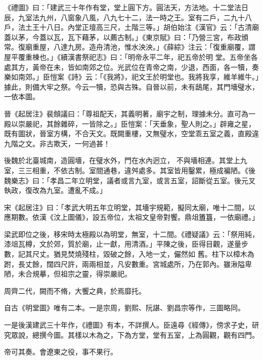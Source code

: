 \begin{pinyinscope}
 《禮圖》曰：「建武三十年作有堂，堂上圓下方。圓法天，方法地。十二堂法日辰，九室法九州，八窗象八風，八九七十二，法一時之王。室有二戶，二九十八戶，法土王十八日。內堂正壇高三尺，土階三等。」胡伯始注《漢官》云：「古清廟蓋以茅，今蓋以瓦，瓦下藉茅，以薦古制。」《東京賦》曰：「乃營三宮，布政頒常。復廟重屋，八達九房。造舟清池，惟水泱泱。」《薛綜》注云：「復重廟覆，謂屋平覆重棟也。」《續漢書祭祀志》曰：「明帝永平二年，祀五帝於明
 堂。五帝坐各處其方，黃帝在未，皆如南郊之位。光武位在青帝之南，少退，西面，各一犢，奏樂如南郊。」臣愷案《詩》云：「《我將》，祀文王於明堂也。我將我享，維羊維牛。」據此，則備大牢之祭。今云一犢，恐與古殊。自晉以前，未有鴟尾，其門墻璧水，一依本圖。



 晉《起居注》裴頠議曰：「尊祖配天，其義明著，廟宇之制，理據未分。直可為一殿以崇嚴祀，其餘雜碎，一皆除之。」臣愷案：「天垂象，聖人則之。」辟雍之星，既有圖狀，晉室方構，不合天文。既闕重樓，又無璧水，空堂乖五室之義，直殿違九階之文。非古欺天，一何過甚！



 後魏於北臺城南，造圓墻，在璧水外，門在水內迥立，
 不與墻相連。其堂上九室，三三相重，不依古制。室間通巷，違舛處多。其室皆用鑿累，極成褊陋。《後魏樂志》曰：「孝昌二年立明堂，議者或言九室，或言五室，詔斷從五室。後元叉執政，復改為九室。遭亂不成。」



 宋《起居注》曰：「孝武大明五年立明堂，其墻宇規範，擬同太廟，唯十二間，以應期數。依漢《汶上圖儀》，設五帝位，太祖文皇帝對饗。鼎俎簠簋，一依廟禮。」



 梁武即位之後，移宋時太極殿以為明堂，無室，十二間。《禮疑議》云：「祭用純，漆俎瓦樽，文於郊，質於廟，止一獻，用清酒。」平陳之後，臣得目觀，遂量步數，記其尺丈。猶見焚燒殘柱，毀破之餘，入地一丈，儼然如
 舊。柱下以樟木為跗，長丈餘，闊四尺許，兩兩相並，凡安數重。宮城處所，乃在郭內。雖湫隘卑陋，未合規摹，但祖宗之靈，得崇嚴祀。



 周齊二代，闕而不脩，大饗之典，於焉靡托。



 自古《明堂圖》唯有二本。一是宗周，劉熙、阮諶、劉昌宗等作，三圖略同。



 一是後漢建武三十年作，《禮圖》有本，不詳撰人。臣遠尋《經傳》，傍求子史，研究眾說，總撰今圖。其樣以木為之，下為方堂，堂有五室，上為圓觀，觀有四門。



 帝可其奏。會遼東之役，事不果行。




\end{pinyinscope}
